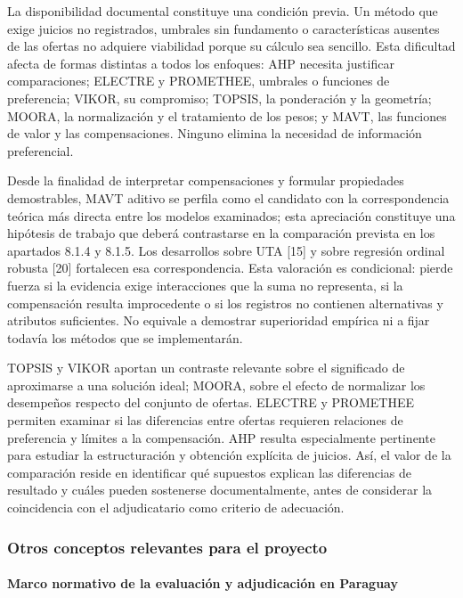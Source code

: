 \documentclass[12pt,a4paper]{article}
\begin{document}
La disponibilidad documental constituye una condición previa. Un método que exige juicios no registrados, umbrales sin fundamento o características ausentes de las ofertas no adquiere viabilidad porque su cálculo sea sencillo. Esta dificultad afecta de formas distintas a todos los enfoques: AHP necesita justificar comparaciones; ELECTRE y PROMETHEE, umbrales o funciones de preferencia; VIKOR, su compromiso; TOPSIS, la ponderación y la geometría; MOORA, la normalización y el tratamiento de los pesos; y MAVT, las funciones de valor y las compensaciones. Ninguno elimina la necesidad de información preferencial.


Desde la finalidad de interpretar compensaciones y formular propiedades demostrables, MAVT aditivo se perfila como el candidato con la correspondencia teórica más directa entre los modelos examinados; esta apreciación constituye una hipótesis de trabajo que deberá contrastarse en la comparación prevista en los apartados 8.1.4 y 8.1.5. Los desarrollos sobre UTA [15] y sobre regresión ordinal robusta [20] fortalecen esa correspondencia. Esta valoración es condicional: pierde fuerza si la evidencia exige interacciones que la suma no representa, si la compensación resulta improcedente o si los registros no contienen alternativas y atributos suficientes. No equivale a demostrar superioridad empírica ni a fijar todavía los métodos que se implementarán.

TOPSIS y VIKOR aportan un contraste relevante sobre el significado de aproximarse a una solución ideal; MOORA, sobre el efecto de normalizar los desempeños respecto del conjunto de ofertas. ELECTRE y PROMETHEE permiten examinar si las diferencias entre ofertas requieren relaciones de preferencia y límites a la compensación. AHP resulta especialmente pertinente para estudiar la estructuración y obtención explícita de juicios. Así, el valor de la comparación reside en identificar qué supuestos explican las diferencias de resultado y cuáles pueden sostenerse documentalmente, antes de considerar la coincidencia con el adjudicatario como criterio de adecuación.

\subsubsection{Otros conceptos relevantes para el proyecto}

\paragraph{Marco normativo de la evaluación y adjudicación en Paraguay}
\end{document}
